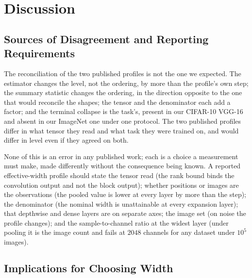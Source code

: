 \documentclass[10pt,journal,compsoc]{IEEEtran}
\begin{document}
\section{Discussion}
\label{sec:discussion}

\subsection{Sources of Disagreement and Reporting Requirements}
\label{sec:why}

The reconciliation of the two published profiles is not the one we
expected. The estimator changes the level, not the ordering, by more than
the profile's own step; the summary statistic changes the ordering, in
the direction opposite to the one that would reconcile the shapes; the
tensor and the denominator each add a factor; and the terminal collapse
is the task's, present in our CIFAR-10 VGG-16 and absent in our ImageNet
one under one protocol. The two published profiles differ in what tensor
they read and what task they were trained on, and would differ in level
even if they agreed on both.

None of this is an error in any published work; each is a choice a
measurement must make, made differently without the consequence being
known.\label{sec:protocol} A reported effective-width profile should
state the tensor read (the rank bound binds the convolution output and
not the block output); whether positions or images are the observations
(the pooled value is lower at every layer by more than the step); the
denominator (the nominal width is unattainable at every expansion layer);
that depthwise and dense layers are on separate axes; the image set (on
noise the profile changes); and the sample-to-channel ratio at the widest
layer (under pooling it is the image count and fails at $2048$ channels
for any dataset under $10^5$ images).

\subsection{Implications for Choosing Width}
\label{sec:implications}
\end{document}
